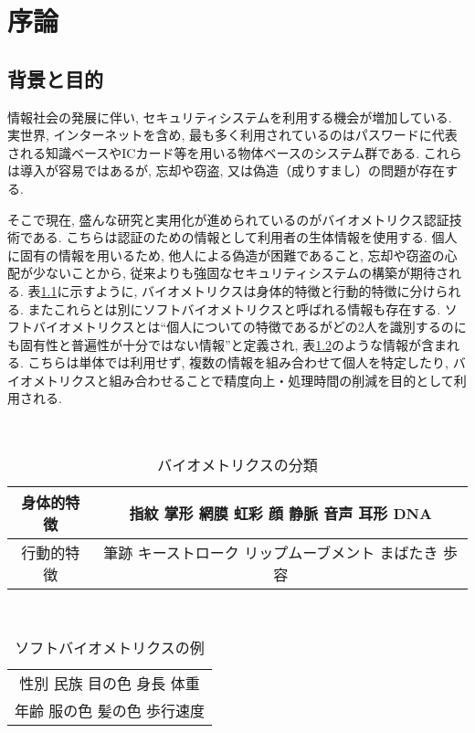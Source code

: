 \chapter{序論}\label{abst}

\section{背景と目的}

情報社会の発展に伴い, セキュリティシステムを利用する機会が増加している. 実世界, インターネットを含め, 最も多く利用されているのはパスワードに代表される知識ベースやICカード等を用いる物体ベースのシステム群である. これらは導入が容易ではあるが, 忘却や窃盗, 又は偽造（成りすまし）の問題が存在する\cite{cite_1}.

そこで現在, 盛んな研究と実用化が進められているのがバイオメトリクス認証技術である. こちらは認証のための情報として利用者の生体情報を使用する. 個人に固有の情報を用いるため, 他人による偽造が困難であること, 忘却や窃盗の心配が少ないことから, 従来よりも強固なセキュリティシステムの構築が期待される. 表\ref{tab:bio}に示すように, バイオメトリクスは身体的特徴と行動的特徴に分けられる. またこれらとは別にソフトバイオメトリクスと呼ばれる情報も存在する. ソフトバイオメトリクスとは“個人についての特徴であるがどの2人を識別するのにも固有性と普遍性が十分ではない情報”と定義され, 表\ref{tab:soft_bio}のような情報が含まれる. こちらは単体では利用せず, 複数の情報を組み合わせて個人を特定したり, バイオメトリクスと組み合わせることで精度向上・処理時間の削減を目的として利用される.

\begin{table}[htbp]
　　\begin{center}
    \caption{バイオメトリクスの分類}
    \begin{tabular}{|c||c|} \hline
      身体的特徴 & 指紋 掌形 網膜 虹彩 顔 静脈 音声 耳形 DNA \\ \hline
      行動的特徴 & 筆跡 キーストローク リップムーブメント まばたき 歩容 \\ \hline
    \end{tabular}
　　　\label{tab:bio}
  \end{center}
\end{table}

\begin{table}[htbp]
  \begin{center}
    \caption{ソフトバイオメトリクスの例}
    \begin{tabular}{|c|} \hline
      性別 民族 目の色 身長 体重 \\ 
      年齢 服の色 髪の色 歩行速度 \\ \hline
    \end{tabular}
    \label{tab:soft_bio}
  \end{center}
\end{table}

